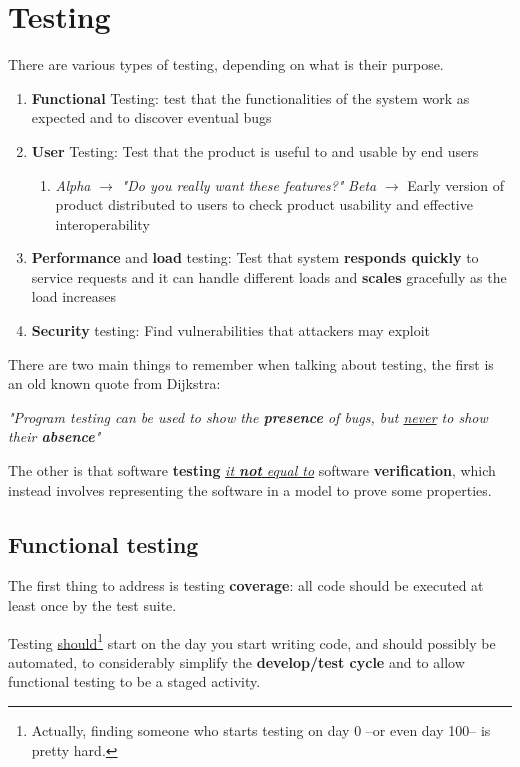 \chapter{Testing}
There are various types of testing, depending on what is their purpose.

\begin{enumerate}
   \item \textbf{Functional} Testing:
   test that the functionalities of the system work as expected and to discover eventual bugs
   \item \textbf{User} Testing:
   Test that the product is useful to and usable by end users
   \begin{enumerate}
      \item 
      \textit{Alpha} $\longrightarrow$ \textit{"Do you really want these features?"}
      \textit{Beta} $\longrightarrow$ Early version of product distributed to users to check product usability and effective interoperability
   \end{enumerate}
   \item \textbf{Performance} and \textbf{load} testing:
   Test that system \textbf{responds quickly} to service requests and it can handle different loads and \textbf{scales} gracefully as the load increases
   \item \textbf{Security} testing:
   Find vulnerabilities that attackers may exploit
\end{enumerate}

There are two main things to remember when talking about testing,
the first is an old known quote from Dijkstra:
\begin{center}
   \textit{"Program testing can be used to show the \textbf{presence} of bugs, but \underline{never} to show their \textbf{absence}"}
\end{center}

The other is that software \textbf{testing} \textit{\underline{it \textbf{not} equal to}} software \textbf{verification},
which instead involves representing the software in a model to prove some properties.

\section{Functional testing}
The first thing to address is testing \textbf{coverage}:
all code should be executed at least once by the test suite.

Testing \underline{should}\footnote{Actually, finding someone who starts testing on day 0 {--}or even day 100{--} is pretty hard.} start on the day you start writing code, and should possibly be automated, to considerably simplify the \textbf{develop/test cycle} and to allow functional testing to be a staged activity.

